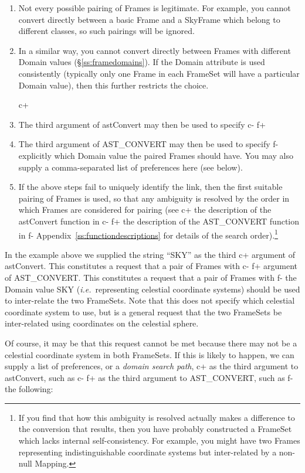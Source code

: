 \documentclass[twoside,11pt]{starlink}
\providecommand{\appref}[1]{Appendix~\ref{#1}}
\providecommand{\secref}[1]{\S\ref{#1}}
\begin{document}
{\begin{enumerate}
\item Not every possible pairing of Frames is legitimate. For example,
you cannot convert directly between a basic Frame and a SkyFrame which
belong to different classes, so such pairings will be ignored.

\item In a similar way, you cannot convert directly between Frames
with different Domain values (\secref{ss:framedomains}). If the Domain
attribute is used consistently (typically only one Frame in each
FrameSet will have a particular Domain value), then this further
restricts the choice.

c+
\item The third argument of astConvert may then be used to specify
c-
f+
\item The third argument of AST\_CONVERT may then be used to specify
f-
explicitly which Domain value the paired Frames should have. You may
also supply a comma-separated list of preferences here (see below).

\item If the above steps fail to uniquely identify the link, then the
first suitable pairing of Frames is used, so that any ambiguity is
resolved by the order in which Frames are considered for pairing (see
c+
the description of the astConvert function in
c-
f+
the description of the AST\_CONVERT function in
f-
\appref{ss:functiondescriptions} for details of the search
order).\footnote{If you find that how this ambiguity is resolved
actually makes a difference to the conversion that results, then you
have probably constructed a FrameSet which lacks internal
self-consistency. For example, you might have two Frames representing
indistinguishable coordinate systems but inter-related by a non-null
Mapping.}
\end{enumerate}

In the example above we supplied the string ``SKY'' as the third
c+
argument of astConvert. This constitutes a request that a pair of
Frames with
c-
f+
argument of AST\_CONVERT. This constitutes a request that a pair of
Frames with
f-
the Domain value SKY (\emph{i.e.}\ representing celestial coordinate
systems) should be used to inter-relate the two FrameSets. Note that
this does not specify which celestial coordinate system to use, but is
a general request that the two FrameSets be inter-related using
coordinates on the celestial sphere.

Of course, it may be that this request cannot be met because there may
not be a celestial coordinate system in both FrameSets. If this is
likely to happen, we can supply a list of preferences, or a
\emph{domain search path},
c+
as the third argument to astConvert, such as
c-
f+
as the third argument to AST\_CONVERT, such as
f-
the following:

}
\end{document}
